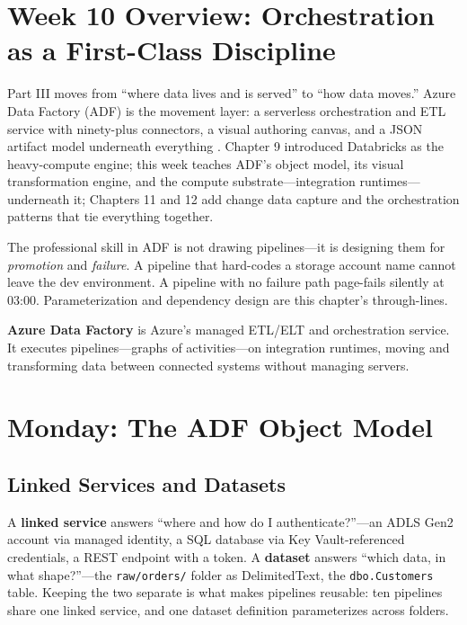 \section{Week 10 Overview: Orchestration as a First-Class Discipline}
Part III moves from ``where data lives and is served'' to ``how data moves.'' Azure Data Factory (ADF) is the movement layer: a serverless orchestration and ETL service with ninety-plus connectors, a visual authoring canvas, and a JSON artifact model underneath everything \cite{microsoft2025adf}. Chapter 9 introduced Databricks as the heavy-compute engine; this week teaches ADF's object model, its visual transformation engine, and the compute substrate---integration runtimes---underneath it; Chapters 11 and 12 add change data capture and the orchestration patterns that tie everything together.

The professional skill in ADF is not drawing pipelines---it is designing them for \emph{promotion} and \emph{failure}. A pipeline that hard-codes a storage account name cannot leave the dev environment. A pipeline with no failure path page-fails silently at 03:00. Parameterization and dependency design are this chapter's through-lines.

\begin{definitionbox}
\textbf{Azure Data Factory} is Azure's managed ETL/ELT and orchestration service. It executes pipelines---graphs of activities---on integration runtimes, moving and transforming data between connected systems without managing servers.
\end{definitionbox}

\section{Monday: The ADF Object Model}

\subsection{Linked Services and Datasets}
A \textbf{linked service} answers ``where and how do I authenticate?''---an ADLS Gen2 account via managed identity, a SQL database via Key Vault-referenced credentials, a REST endpoint with a token. A \textbf{dataset} answers ``which data, in what shape?''---the \texttt{raw/orders/} folder as DelimitedText, the \texttt{dbo.Customers} table. Keeping the two separate is what makes pipelines reusable: ten pipelines share one linked service, and one dataset definition parameterizes across folders.

